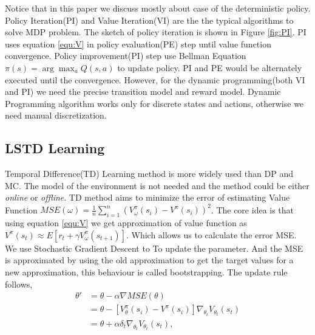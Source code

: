 Notice that in this paper we discuss mostly about case of the deterministic policy. Policy Iteration(PI) and Value Iteration(VI) are the the typical algorithms to solve MDP problem. The sketch of policy iteration is shown in Figure \ref{fig:PI}. 
PI uses equation \eqref{equ:V} in policy evaluation(PE) step until value function convergence. Policy improvement(PI) step  use Bellman Equation $\pi(s) = \arg \max_a Q(s,a)$ to update policy. PI and PE would be alternately executed until the convergence. However, for the dynamic programming(both VI and PI) we need the precise transition model and reward model. Dynamic Programming algorithm works only for discrete states and actions, otherwise we need manual discretization.

\subsection{LSTD Learning}
Temporal Difference(TD) Learning method is more widely used than DP and MC. 
The model of the environment is not needed and the method could be either \textit{online} or \textit{offline}.
TD method aims to minimize the error of estimating Value Function $MSE(\omega) = \frac{1}{n} \sum_{i=1}^{n}(V_\omega^\pi (s_i) - V^{\pi}(s_i))^2$. The core idea is that using equation \eqref{equ:V} we get approximation of value function as $V^\pi (s_t) \approx E[r_t + \gamma V_\omega ^\pi(s_{t+1})] $. Which allows us to calculate the error MSE.  We use Stochastic Gradient Descent to To update the parameter. And the MSE is approximated by using the old approximation to get the target values for a new approximation, this behaviour is called bootstrapping.
The update rule follows,
\begin{align}
\theta ' &= \theta - \alpha \nabla MSE(\theta)\nonumber  \\
		&= \theta -[V_\theta^\pi(s_i) - V^{\pi}(s_i)] \nabla_{\theta_t}V_{\theta_t} (s_t) \nonumber \\
		&= \theta + \alpha \delta_t \nabla_{\theta_t} V_{\theta_t}(s_t),
\end{align}
